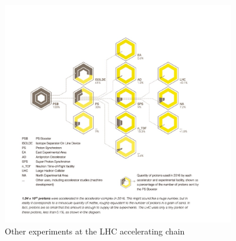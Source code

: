 \begin{figure}[!htbp]
	\centering
	\includegraphics[width=0.9\textwidth]{figures/LHC/distribution_of_protons_en.jpg}
	\caption{Other experiments at the LHC accelerating chain~\cite{Pralavorio2017}}
	\label{fig:OtherExpAtAccStructure}
\end{figure}
